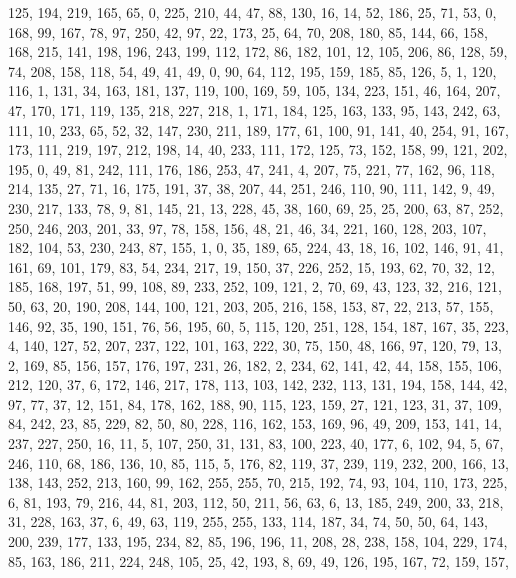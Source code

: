 \begin{DoxyCode}
       125, 194, 219, 165, 65, 0, 225, 210, 44, 47, 88, 130, 16, 14, 52, 186, 25, 71, 53, 0, 168, 99, 167, 78, 97,
       250, 42, 97, 22, 173, 25, 64, 70, 208, 180, 85, 144, 66, 158, 168, 215, 141, 198, 196, 243, 199, 112, 172, 86,
       182, 101, 12, 105, 206, 86, 128, 59, 74, 208, 158, 118, 54, 49, 41, 49, 0, 90, 64, 112, 195, 159, 185, 85,
       126, 5, 1, 120, 116, 1, 131, 34, 163, 181, 137, 119, 100, 169, 59, 105, 134, 223, 151, 46, 164, 207, 47, 170,
       171, 119, 135, 218, 227, 218, 1, 171, 184, 125, 163, 133, 95, 143, 242, 63, 111, 10, 233, 65, 52, 32, 147,
       230, 211, 189, 177, 61, 100, 91, 141, 40, 254, 91, 167, 173, 111, 219, 197, 212, 198, 14, 40, 233, 111, 172,
       125, 73, 152, 158, 99, 121, 202, 195, 0, 49, 81, 242, 111, 176, 186, 253, 47, 241, 4, 207, 75, 221, 77,
       162, 96, 118, 214, 135, 27, 71, 16, 175, 191, 37, 38, 207, 44, 251, 246, 110, 90, 111, 142, 9, 49, 230, 217,
       133, 78, 9, 81, 145, 21, 13, 228, 45, 38, 160, 69, 25, 25, 200, 63, 87, 252, 250, 246, 203, 201, 33, 97, 78,
       158, 156, 48, 21, 46, 34, 221, 160, 128, 203, 107, 182, 104, 53, 230, 243, 87, 155, 1, 0, 35, 189, 65, 224,
       43, 18, 16, 102, 146, 91, 41, 161, 69, 101, 179, 83, 54, 234, 217, 19, 150, 37, 226, 252, 15, 193, 62, 70,
       32, 12, 185, 168, 197, 51, 99, 108, 89, 233, 252, 109, 121, 2, 70, 69, 43, 123, 32, 216, 121, 50, 63, 20, 190,
       208, 144, 100, 121, 203, 205, 216, 158, 153, 87, 22, 213, 57, 155, 146, 92, 35, 190, 151, 76, 56, 195, 60,
       5, 115, 120, 251, 128, 154, 187, 167, 35, 223, 4, 140, 127, 52, 207, 237, 122, 101, 163, 222, 30, 75, 150,
       48, 166, 97, 120, 79, 13, 2, 169, 85, 156, 157, 176, 197, 231, 26, 182, 2, 234, 62, 141, 42, 44, 158, 155,
       106, 212, 120, 37, 6, 172, 146, 217, 178, 113, 103, 142, 232, 113, 131, 194, 158, 144, 42, 97, 77, 37, 12,
       151, 84, 178, 162, 188, 90, 115, 123, 159, 27, 121, 123, 31, 37, 109, 84, 242, 23, 85, 229, 82, 50, 80, 228,
       116, 162, 153, 169, 96, 49, 209, 153, 141, 14, 237, 227, 250, 16, 11, 5, 107, 250, 31, 131, 83, 100, 223, 40,
       177, 6, 102, 94, 5, 67, 246, 110, 68, 186, 136, 10, 85, 115, 5, 176, 82, 119, 37, 239, 119, 232, 200, 166,
       13, 138, 143, 252, 213, 160, 99, 162, 255, 255, 70, 215, 192, 74, 93, 104, 110, 173, 225, 6, 81, 193, 79,
       216, 44, 81, 203, 112, 50, 211, 56, 63, 6, 13, 185, 249, 200, 33, 218, 31, 228, 163, 37, 6, 49, 63, 119, 255,
       255, 133, 114, 187, 34, 74, 50, 50, 64, 143, 200, 239, 177, 133, 195, 234, 82, 85, 196, 196, 11, 208, 28,
       238, 158, 104, 229, 174, 85, 163, 186, 211, 224, 248, 105, 25, 42, 193, 8, 69, 49, 126, 195, 167, 72, 159, 157,

\end{DoxyCode}
